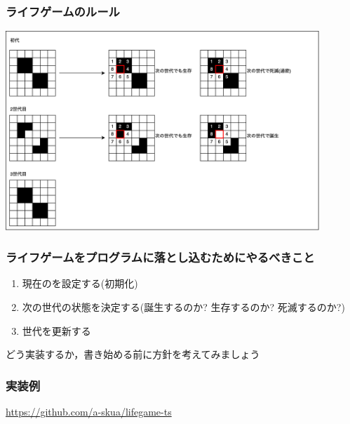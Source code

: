 \documentclass[aspectratio=169]{beamer}
\begin{document}
\begin{frame}\frametitle{ライフゲームのルール}
  \begin{center}
    \includegraphics[height=7.5cm]{asset/lifegame_cycle.png}
  \end{center}
\end{frame}

\begin{frame}\frametitle{ライフゲームをプログラムに落とし込むためにやるべきこと}
  \begin{enumerate}
    \item 現在のを設定する(初期化)
    \item 次の世代の状態を決定する(誕生するのか? 生存するのか? 死滅するのか?)
    \item 世代を更新する
  \end{enumerate}

  どう実装するか，書き始める前に方針を考えてみましょう
\end{frame}

\begin{frame}\frametitle{実装例}
  \url{https://github.com/a-skua/lifegame-ts}
\end{frame}
\end{document}
